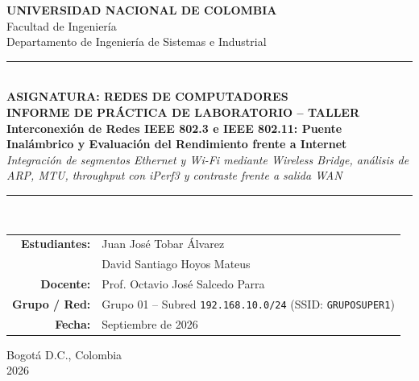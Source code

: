 \documentclass[11pt, a4paper]{article}
\begin{document}
\begin{titlepage}
    \centering
    \vspace*{0.8cm}
    {\Large \textbf{UNIVERSIDAD NACIONAL DE COLOMBIA}}\\[0.25cm]
    {\large Facultad de Ingeniería}\\
    {\large Departamento de Ingeniería de Sistemas e Industrial}\\[1.2cm]

    \textcolor{unalgreen}{\rule{\textwidth}{1.5pt}}\\[0.5cm]
    {\small \textbf{ASIGNATURA: REDES DE COMPUTADORES}}\\[0.4cm]
    {\LARGE \textbf{INFORME DE PRÁCTICA DE LABORATORIO -- TALLER}}\\[0.35cm]
    {\Large \textbf{Interconexión de Redes IEEE 802.3 e IEEE 802.11: Puente Inalámbrico y Evaluación del Rendimiento frente a Internet}}\\[0.3cm]
    {\normalsize \textit{Integración de segmentos Ethernet y Wi-Fi mediante Wireless Bridge, análisis de ARP, MTU, throughput con iPerf3 y contraste frente a salida WAN}}\\[0.5cm]
    \textcolor{unalgreen}{\rule{\textwidth}{1.5pt}}\\[1.5cm]

    \begin{tabular}{rl}
        \textbf{Estudiantes:} & Juan José Tobar Álvarez \\
                              & David Santiago Hoyos Mateus \\[0.5cm]
        \textbf{Docente:}     & Prof. Octavio José Salcedo Parra \\[0.5cm]
        \textbf{Grupo / Red:} & Grupo 01 -- Subred \texttt{192.168.10.0/24} (SSID: \texttt{GRUPOSUPER1}) \\[0.5cm]
        \textbf{Fecha:}       & Septiembre de 2026 \\
    \end{tabular}

    \vfill
    {\normalsize Bogotá D.C., Colombia}\\
    {\normalsize 2026}
\end{titlepage}

\end{document}
